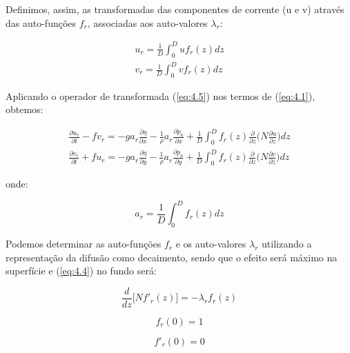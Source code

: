 \documentclass[11pt]{article}
\begin{document}
Definimos, assim, as transformadas das componentes de corrente (u e v)
através das auto-funções \(f_r\), associadas aos auto-valores
\(\lambda_r\):

\begin{equation}
  \begin{aligned}
  u_r = \frac{1}{D}\int^{D}_{0}u f_r(z) dz
  \\
  v_r = \frac{1}{D}\int^{D}_{0}v f_r(z) dz
  \label{eq:4.5}
  \end{aligned}
\end{equation}

Aplicando o operador de transformada (\ref{eq:4.5}) nos termos de
(\ref{eq:4.1}), obtemos:

\begin{equation}
  \begin{aligned}
  \frac{\partial{u_r}}{\partial{t}} - fv_r = -ga_r\frac{\partial{\eta}}{\partial{x}} - \frac{1}{\rho}a_r\frac{\partial{p_a}}{\partial{x}} + \frac{1}{D}\int^{D}_{0}f_r(z)\frac{\partial}{\partial{z}}\bigg( N\frac{\partial{u}}{\partial{z}} \bigg)dz
  \\
  \frac{\partial{v_r}}{\partial{t}} + fu_r = -ga_r\frac{\partial{\eta}}{\partial{y}} - \frac{1}{\rho}a_r\frac{\partial{p_a}}{\partial{y}} + \frac{1}{D}\int^{D}_{0}f_r(z)\frac{\partial}{\partial{z}}\bigg( N\frac{\partial{v}}{\partial{z}} \bigg)dz
  \label{eq:4.6}
  \end{aligned}
\end{equation}

onde:

\begin{equation}
    a_r = \frac{1}{D}\int^{D}_{0}f_r(z)dz
    \label{eq:4.7}
\end{equation}

Podemos determinar as auto-funções \(f_r\) e os auto-valores
\(\lambda_r\) utilizando a representação da difusão como decaimento,
sendo que o efeito será máximo na superfície e (\ref{eq:4.4}) no fundo
será:

\begin{equation}
    \frac{d}{dz}\bigg[ Nf'_r(z) \bigg] = -\lambda_r f_r(z)
\end{equation}

\begin{equation}
    f_r(0) = 1
    \label{eq:4.8}
\end{equation}

\begin{equation}
    f'_r(0) = 0
    \label{eq:4.9}
\end{equation}
\end{document}
